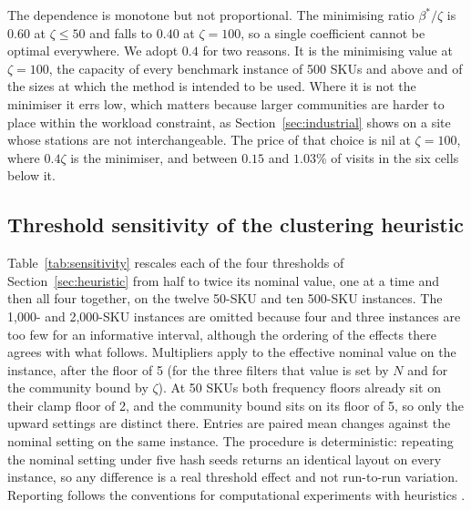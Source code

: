 \documentclass[]{interact}
\begin{document}
The dependence is monotone but not proportional. The minimising ratio $\beta^\ast/\zeta$ is $0.60$ at $\zeta\le 50$ and falls to $0.40$ at $\zeta=100$, so a single coefficient cannot be optimal everywhere. We adopt $0.4$ for two reasons. It is the minimising value at $\zeta=100$, the capacity of every benchmark instance of 500 SKUs and above and of the sizes at which the method is intended to be used. Where it is not the minimiser it errs low, which matters because larger communities are harder to place within the workload constraint, as Section~\ref{sec:industrial} shows on a site whose stations are not interchangeable. The price of that choice is nil at $\zeta=100$, where $0.4\zeta$ is the minimiser, and between $0.15$ and $1.03$\% of visits in the six cells below it.

\subsection{Threshold sensitivity of the clustering heuristic}\label{app:sensitivity}

Table~\ref{tab:sensitivity} rescales each of the four thresholds of Section~\ref{sec:heuristic} from half to twice its nominal value, one at a time and then all four together, on the twelve 50-SKU and ten 500-SKU instances. The 1,000- and 2,000-SKU instances are omitted because four and three instances are too few for an informative interval, although the ordering of the effects there agrees with what follows. Multipliers apply to the effective nominal value on the instance, after the floor of 5 (for the three filters that value is set by $N$ and for the community bound by $\zeta$). At 50 SKUs both frequency floors already sit on their clamp floor of 2, and the community bound sits on its floor of 5, so only the upward settings are distinct there. Entries are paired mean changes against the nominal setting on the same instance. The procedure is deterministic: repeating the nominal setting under five hash seeds returns an identical layout on every instance, so any difference is a real threshold effect and not run-to-run variation. Reporting follows the conventions for computational experiments with heuristics \citep{barr1995designing, hooker1995testing}.
\end{document}
